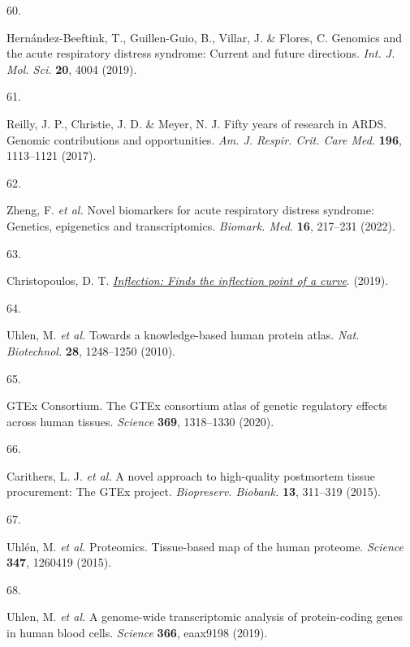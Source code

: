 \documentclass[
  11,
  a4paper,
]{article}
\newlength{\cslhangindent}
\newlength{\csllabelwidth}
\newlength{\cslentryspacingunit} %
\newenvironment{CSLReferences}[2] %
 {%
  \setlength{\parindent}{0pt}
  \ifodd #1
  \let\oldpar\par
  \def\par{\hangindent=\cslhangindent\oldpar}
  \fi
  \setlength{\parskip}{#2\cslentryspacingunit}
 }%
 {}
\newcommand{\CSLLeftMargin}[1]{\parbox[t]{\csllabelwidth}{#1}}
\newcommand{\CSLRightInline}[1]{\parbox[t]{\linewidth - \csllabelwidth}{#1}\break}
\begin{document}
\begin{CSLReferences}{0}{0}
\leavevmode{}%
\CSLLeftMargin{60. }%
\CSLRightInline{Hernández-Beeftink, T., Guillen-Guio, B., Villar, J. \&
Flores, C. Genomics and the acute respiratory distress syndrome: Current
and future directions. \emph{Int. J. Mol. Sci.} \textbf{20}, 4004
(2019).}

\leavevmode{}%
\CSLLeftMargin{61. }%
\CSLRightInline{Reilly, J. P., Christie, J. D. \& Meyer, N. J. Fifty
years of research in {ARDS}. Genomic contributions and opportunities.
\emph{Am. J. Respir. Crit. Care Med.} \textbf{196}, 1113--1121 (2017).}

\leavevmode{}%
\CSLLeftMargin{62. }%
\CSLRightInline{Zheng, F. \emph{et al.} Novel biomarkers for acute
respiratory distress syndrome: Genetics, epigenetics and
transcriptomics. \emph{Biomark. Med.} \textbf{16}, 217--231 (2022).}

\leavevmode{}%
\CSLLeftMargin{63. }%
\CSLRightInline{Christopoulos, D. T.
\emph{\href{https://CRAN.R-project.org/package=inflection}{Inflection:
Finds the inflection point of a curve}}. (2019).}

\leavevmode{}%
\CSLLeftMargin{64. }%
\CSLRightInline{Uhlen, M. \emph{et al.} Towards a knowledge-based human
protein atlas. \emph{Nat. Biotechnol.} \textbf{28}, 1248--1250 (2010).}

\leavevmode{}%
\CSLLeftMargin{65. }%
\CSLRightInline{GTEx Consortium. The {GTEx} consortium atlas of genetic
regulatory effects across human tissues. \emph{Science} \textbf{369},
1318--1330 (2020).}

\leavevmode{}%
\CSLLeftMargin{66. }%
\CSLRightInline{Carithers, L. J. \emph{et al.} A novel approach to
high-quality postmortem tissue procurement: The {GTEx} project.
\emph{Biopreserv. Biobank.} \textbf{13}, 311--319 (2015).}

\leavevmode{}%
\CSLLeftMargin{67. }%
\CSLRightInline{Uhlén, M. \emph{et al.} Proteomics. Tissue-based map of
the human proteome. \emph{Science} \textbf{347}, 1260419 (2015).}

\leavevmode{}%
\CSLLeftMargin{68. }%
\CSLRightInline{Uhlen, M. \emph{et al.} A genome-wide transcriptomic
analysis of protein-coding genes in human blood cells. \emph{Science}
\textbf{366}, eaax9198 (2019).}


\end{CSLReferences}
\end{document}
